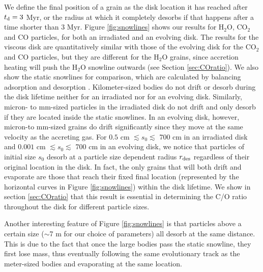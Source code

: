 \documentclass[apj]{emulateapj}
\begin{document}
We define the final position of a grain as the disk location it has reached after $t_{\rm d}=3$ Myr, or the radius at which it completely desorbs if that happens after a time shorter than 3 Myr.  Figure \ref{fig:snowlines} shows our results for H$_2$O, CO$_2$ and CO particles, for both an irradiated and an evolving disk. The results for the viscous disk are quantitatively similar with those of the evolving disk for the CO$_2$ and CO particles, but they are different for the H$_2$O grains, since accretion heating will push the H$_2$O snowline outwards (see Section \ref{sec:COratio}). We also show the static snowlines for comparison, which are calculated by balancing adsorption and desorption \citep{hollenbach09}. %
Kilometer-sized bodies do not drift or desorb during the disk lifetime neither for an irradiated nor for an evolving disk. Similarly, micron- to mm-sized particles in the irradiated disk do not drift and only %
desorb if %
they are located inside the static snowlines. %
In an evolving disk, however, micron-to mm-sized grains do drift significantly since they move at the same velocity as the accreting gas. For $0.5$ cm $\lesssim s_0 \lesssim$ 700 cm in an irradiated disk and $0.001$ cm $\lesssim s_0 \lesssim$ 700 cm in an evolving disk, we notice that particles of initial size $s_0$ desorb at a %
particle size dependent radius $r_{\rm des}$ regardless of their original location in the disk. In fact, the only grains that will both drift and evaporate are those that reach their fixed final location (represented by the horizontal curves in Figure \ref{fig:snowlines}) within the disk lifetime. We show in section \ref{sec:COratio} that this result is essential in determining the C/O ratio throughout the disk for different particle sizes. 

Another interesting feature of Figure \ref{fig:snowlines} is that particles above a certain size ($\sim$7 m for our choice of parameters) all desorb at the same distance. This is due to the fact that once the large bodies pass the static snowline, they first lose mass, thus eventually following the same evolutionary track as the meter-sized bodies and evaporating at the same location.
\end{document}
